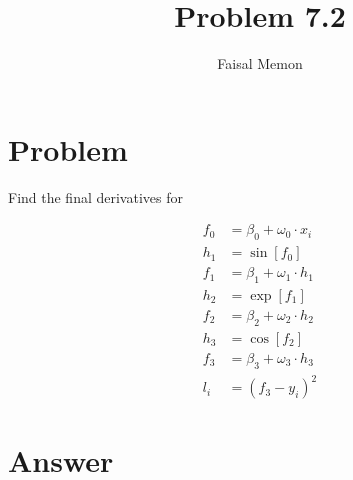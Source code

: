 \documentclass{article}
\title{Problem 7.2}
\author{Faisal Memon}
\begin{document}
\maketitle

\section{Problem}

Find the final derivatives for

\begin{align*}
    f_{0} &= \beta_{0} + \omega_{0} \cdot x_{i} \\
    h_{1} &= \sin[f_{0}] \\
    f_{1} &= \beta_{1} + \omega_{1} \cdot h_{1} \\
    h_{2} &= \exp[f_{1}] \\
    f_{2} &= \beta_{2} + \omega_{2} \cdot h_{2} \\
    h_{3} &= \cos[f_{2}] \\
    f_{3} &= \beta_{3} + \omega_{3} \cdot h_{3} \\
    l_{i} &= (f_{3}- y_{i})^2
\end{align*}

\section{Answer}
\end{document}
